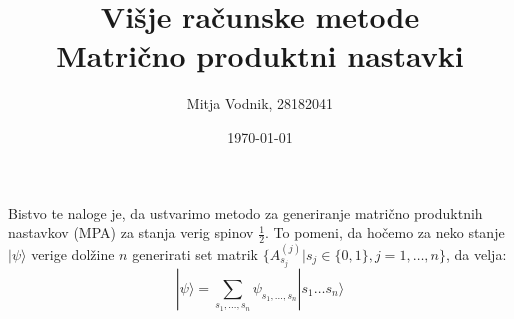 \documentclass[a4paper]{article}
\newcommand{\half}{\frac{1}{2}}
\newcommand{\ket}[1]{|#1\rangle}
\newcommand{\range}[2]{#1, \ldots, #2}
\newcommand{\seq}[2]{#1 \ldots #2}
\newcommand{\psiCoef}[2]{\psi_{\range{#1}{#2}}}
\newcommand{\mpa}[2]{#1^{(#2)}_{s_#2}}
\begin{document}
    \title{\sc\large Višje računske metode\\
		\bigskip
		\bf\Large Matrično produktni nastavki}
	\author{Mitja Vodnik, 28182041}
            \date{\today}
	\maketitle

    Bistvo te naloge je, da ustvarimo metodo za generiranje matrično produktnih nastavkov (MPA) za stanja verig spinov $\half$.
    To pomeni, da hočemo za neko stanje $\ket{\psi}$ verige dolžine $n$ generirati set matrik
    $\big\{\mpa{A}{j} | s_j \in \{0, 1\}, j = \range{1}{n}\big\}$, da velja:\\

    \begin{equation}\label{eq1}
        \ket{\psi} = \sum_{\range{s_1}{s_n}} \psiCoef{s_1}{s_n} \ket{\seq{s_1}{s_n}}
    \end{equation}

    \iffalse
    \begin{figure}
        \centering
        \texttt{[image: slika1.pdf]}
        \caption{Odvisnost entropije prepletenosti simetrične biparticije osnovnega stanja od dolžine verige. Dolžine verig na tem grafu so le sode.}
        \label{slika1}
    \end{figure}

    \begin{figure}
        \centering
        \begin{subfigure}{\textwidth}
            \texttt{[image: slika4a.pdf]}
        \end{subfigure}
        \begin{subfigure}{\textwidth}
            \texttt{[image: slika4b.pdf]}
        \end{subfigure}
        \caption{Odvisnost entropije prepletenosti od velikosti blokov biparticije osnovnega stanja s periodičnimi robnimi pogoji.}
        \label{slika4}
    \end{figure}
    \fi
\end{document}
